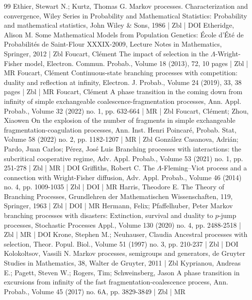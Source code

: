 \begin{thebibliography}{99}
 Ethier, Stewart N.; Kurtz, Thomas G. Markov processes. Characterization and convergence, Wiley Series in Probability and Mathematical Statistics: Probability and mathematical statistics, John Wiley \& Sons, 1986 | Zbl | DOI
 Etheridge, Alison M. Some Mathematical Models from Population Genetics: École d’Été de Probabilités de Saint-Flour XXXIX-2009, Lecture Notes in Mathematics, Springer, 2012 | Zbl
 Foucart, Clément The impact of selection in the $\Lambda $-Wright-Fisher model, Electron. Commun. Probab., Volume 18 (2013), 72, 10 pages | Zbl | MR
 Foucart, Clément Continuous-state branching processes with competition: duality and reflection at infinity, Electron. J. Probab., Volume 24 (2019), 33, 38 pages | Zbl | MR
 Foucart, Clément A phase transition in the coming down from infinity of simple exchangeable coalescence-fragmentation processes, Ann. Appl. Probab., Volume 32 (2022) no. 1, pp. 632-664 | MR | Zbl
 Foucart, Clément; Zhou, Xiaowen On the explosion of the number of fragments in simple exchangeable fragmentation-coagulation processes, Ann. Inst. Henri Poincaré, Probab. Stat, Volume 58 (2022) no. 2, pp. 1182-1207 | MR | Zbl
 González Casanova, Adrián; Pardo, Juan Carlos; Pérez, José Luis Branching processes with interactions: the subcritical cooperative regime, Adv. Appl. Probab., Volume 53 (2021) no. 1, pp. 251-278 | Zbl | MR | DOI
 Griffiths, Robert C. The $\Lambda $-Fleming–Viot process and a connection with Wright-Fisher diffusion, Adv. Appl. Probab., Volume 46 (2014) no. 4, pp. 1009-1035 | Zbl | DOI | MR
 Harris, Theodore E. The Theory of Branching Processes, Grundlehren der Mathematischen Wissenschaften, 119, Springer, 1963 | Zbl | DOI | MR
 Hermann, Felix; Pfaffelhuber, Peter Markov branching processes with disasters: Extinction, survival and duality to $p$-jump processes, Stochastic Processes Appl., Volume 130 (2020) no. 4, pp. 2488-2518 | Zbl | MR | DOI
 Krone, Stephen M.; Neuhauser, Claudia Ancestral processes with selection, Theor. Popul. Biol., Volume 51 (1997) no. 3, pp. 210-237 | Zbl | DOI
 Kolokoltsov, Vassili N. Markov processes, semigroups and generators, de Gruyter Studies in Mathematics, 38, Walter de Gruyter, 2011 | Zbl
 Kyprianou, Andreas E.; Pagett, Steven W.; Rogers, Tim; Schweinsberg, Jason A phase transition in excursions from infinity of the fast fragmentation-coalescence process, Ann. Probab., Volume 45 (2017) no. 6A, pp. 3829-3849 | Zbl | MR

\end{thebibliography}
